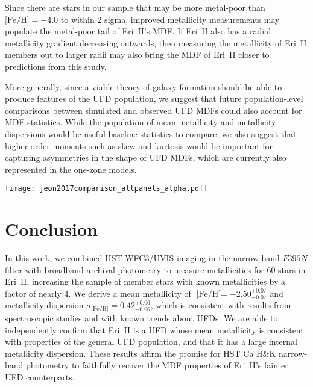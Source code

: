 \documentclass[twocolumn]{aastex63}
\newcommand{\met}	  {$-$2.50}	%
\newcommand{\metlerr} {0.07} %
\newcommand{\metuerr} {0.07} %
\newcommand{\metdisp}     {0.42} %
\newcommand{\metdisplerr} {0.06} %
\newcommand{\metdispuerr} {0.06} %
\begin{document}
\par Since there are stars in our sample that may be more metal-poor than $\mbox{[Fe/H]}=-4.0$ to within 2 sigma, improved metallicity measurements may populate the metal-poor tail of Eri~II's MDF. If Eri~II also has a radial metallicity gradient decreasing outwards, then measuring the metallicity of Eri~II members out to larger radii may also bring the MDF of Eri~II closer to predictions from this study. 

\par More generally, since a viable theory of galaxy formation should be able to produce features of the UFD population, we suggest that future population-level comparisons between simulated and observed UFD MDFs could also account for MDF statistics. While the population of mean metallicity and metallicity dispersions would be useful baseline statistics to compare, we also suggest that higher-order moments such as skew and kurtosis would be important for capturing asymmetries in the shape of UFD MDFs, which are currently also represented in the one-zone models. 

\begin{figure*}
    \centering
    \texttt{[image: jeon2017comparison\_allpanels\_alpha.pdf]}
    \caption{Comparison of the MDF that we derive for Eri~II (gray shaded histogram; $M_{star}\sim1\times10^5M_{\odot}$, $\mbox{[Fe/H]}=$\met, $\sigma=\metdisp$, $\mbox{skew}=-0.21$) with the 6 UFD MDFs simulated from \citet{jeon2017popIII}. Following convention in previous histogram plots, binsizes are 0.35~dex wide. The stellar mass of the corresponding halo at $z=0$ are in the title of each panel. We also compute the mean metallicity, metallicity dispersion, and skew of the simulated MDFs. All of the simulated MDFs are skewed relative to Eri~II, with long metal-poor tails.}
    \label{fig:jeon17comparison}
\end{figure*}

\section{Conclusion}
\label{sec:conclusion}

\par In this work, we combined HST WFC3/UVIS imaging in the narrow-band $F395N$ filter with broadband archival photometry to measure metallicities for 60 stars in Eri~II, increasing the sample of member stars with known metallicities by a factor of nearly 4. We derive a mean metallicity of $\mbox{[Fe/H]}=$\met$^{+\metuerr}_{-\metlerr}$ and metallicity dispersion $\sigma_{\mbox{[Fe/H]}}=\metdisp^{+\metdispuerr}_{-\metdisplerr}$, which is consistent with results from spectroscopic studies and with known trends about UFDs. We are able to independently confirm that Eri~II is a UFD whose mean metallicity is consistent with properties of the general UFD population, and that it has a large internal metallicity dispersion. These results affirm the promise for HST Ca H\&K narrow-band photometry to faithfully recover the MDF properties of Eri~II's fainter UFD counterparts.
\end{document}
